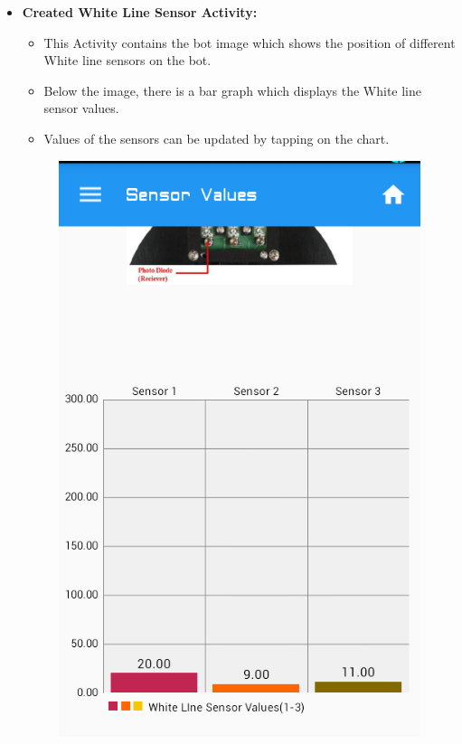 \documentclass[a4paper,12pt,oneside]{book}
\begin{document}
\begin{enumerate}
\begin{itemize}
\begin{figure}[h]
\begin{center}
					\end{center}
				\end{figure}
			\newpage
			\item \textbf{Created White Line Sensor Activity:}
			\begin{itemize}
			    \item This Activity contains the bot image which shows the position of different White line sensors on the bot.
				\item Below the image, there is a bar graph which displays the White line sensor values.
				\item Values of the sensors can be updated by tapping on the chart.
			\end{itemize}   	
			\begin{figure}[h]
				\begin{center}
				    \includegraphics[scale=0.4]{whitelinesensor.png}
				\end{center}
			\end{figure} 
				

\end{itemize}
\end{enumerate}
\end{document}
